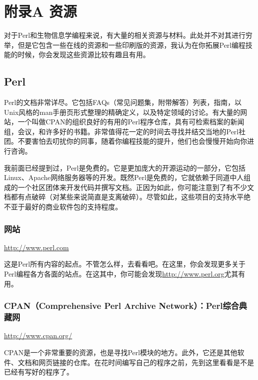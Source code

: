 \chapter{附录A 资源}
\label{chap:chapteraa}
\minitoc

对于Perl和生物信息学编程来说，有大量的相关资源与材料。此处并不对其进行穷举，但是它包含一些在线的资源和一些印刷版的资源，我认为在你拓展Perl编程技能的时候，你会发现这些资源比较有趣且有用。

\section{Perl}
Perl的文档非常详尽。它包括FAQs（常见问题集，附带解答）列表，指南，以Unix风格的man手册页形式整理的精确定义，以及特定领域的讨论。有大量的网站，一个叫做CPAN的组织良好的有用的Perl程序仓库，具有可检索档案的新闻组，会议，和许多好的书籍。非常值得花一定的时间去寻找并结交当地的Perl社团。不要害怕去叨扰你的同事，随着你编程技能的提升，他们也会慢慢开始向你进行咨询。

我前面已经提到过，Perl是免费的。它是更加庞大的开源运动的一部分，它包括Linux、Apache网络服务器等的开发。既然Perl是免费的，它就依赖于同道中人组成的一个社区团体来开发代码并撰写文档。正因为如此，你可能注意到了有不少文档都有点破碎（对某些来说简直是支离破碎）。尽管如此，这些项目的支持水平绝不亚于最好的商业软件包的支持程度。

\subsection{网站}
\href{http://www.perl.com}{http://www.perl.com}

\begin{adjustwidth}{1cm}{}
这是Perl所有内容的起点。不管怎么样，去看看吧。在这里，你会发现更多关于Perl编程各方各面的站点。在这其中，你可能会发现\href{http://www.perl.org}{http://www.perl.org}尤其有用。
\end{adjustwidth}

\subsection{CPAN（Comprehensive Perl Archive Network）：Perl综合典藏网}
\href{http://www.cpan.org/}{http://www.cpan.org/}

\begin{adjustwidth}{1cm}{}
CPAN是一个非常重要的资源，也是寻找Perl模块的地方。此外，它还是其他软件、文档和网页链接的仓库。在花时间编写自己的程序之前，先到这里看看是不是已经有写好的程序了。
\end{adjustwidth}

